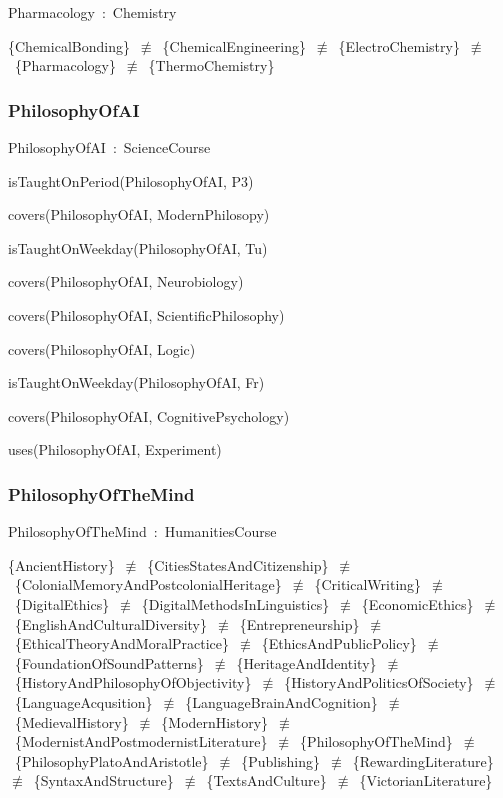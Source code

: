 \documentclass{article}
\begin{document}
Pharmacology~:~Chemistry

\{ChemicalBonding\}~\ensuremath{\not\equiv}~\{ChemicalEngineering\}~\ensuremath{\not\equiv}~\{ElectroChemistry\}~\ensuremath{\not\equiv}~\{Pharmacology\}~\ensuremath{\not\equiv}~\{ThermoChemistry\}

\subsubsection*{PhilosophyOfAI}

PhilosophyOfAI~:~ScienceCourse

isTaughtOnPeriod(PhilosophyOfAI, P3)

covers(PhilosophyOfAI, ModernPhilosopy)

isTaughtOnWeekday(PhilosophyOfAI, Tu)

covers(PhilosophyOfAI, Neurobiology)

covers(PhilosophyOfAI, ScientificPhilosophy)

covers(PhilosophyOfAI, Logic)

isTaughtOnWeekday(PhilosophyOfAI, Fr)

covers(PhilosophyOfAI, CognitivePsychology)

uses(PhilosophyOfAI, Experiment)

\subsubsection*{PhilosophyOfTheMind}

PhilosophyOfTheMind~:~HumanitiesCourse

\{AncientHistory\}~\ensuremath{\not\equiv}~\{CitiesStatesAndCitizenship\}~\ensuremath{\not\equiv}~\{ColonialMemoryAndPostcolonialHeritage\}~\ensuremath{\not\equiv}~\{CriticalWriting\}~\ensuremath{\not\equiv}~\{DigitalEthics\}~\ensuremath{\not\equiv}~\{DigitalMethodsInLinguistics\}~\ensuremath{\not\equiv}~\{EconomicEthics\}~\ensuremath{\not\equiv}~\{EnglishAndCulturalDiversity\}~\ensuremath{\not\equiv}~\{Entrepreneurship\}~\ensuremath{\not\equiv}~\{EthicalTheoryAndMoralPractice\}~\ensuremath{\not\equiv}~\{EthicsAndPublicPolicy\}~\ensuremath{\not\equiv}~\{FoundationOfSoundPatterns\}~\ensuremath{\not\equiv}~\{HeritageAndIdentity\}~\ensuremath{\not\equiv}~\{HistoryAndPhilosophyOfObjectivity\}~\ensuremath{\not\equiv}~\{HistoryAndPoliticsOfSociety\}~\ensuremath{\not\equiv}~\{LanguageAcqusition\}~\ensuremath{\not\equiv}~\{LanguageBrainAndCognition\}~\ensuremath{\not\equiv}~\{MedievalHistory\}~\ensuremath{\not\equiv}~\{ModernHistory\}~\ensuremath{\not\equiv}~\{ModernistAndPostmodernistLiterature\}~\ensuremath{\not\equiv}~\{PhilosophyOfTheMind\}~\ensuremath{\not\equiv}~\{PhilosophyPlatoAndAristotle\}~\ensuremath{\not\equiv}~\{Publishing\}~\ensuremath{\not\equiv}~\{RewardingLiterature\}~\ensuremath{\not\equiv}~\{SyntaxAndStructure\}~\ensuremath{\not\equiv}~\{TextsAndCulture\}~\ensuremath{\not\equiv}~\{VictorianLiterature\}
\end{document}
